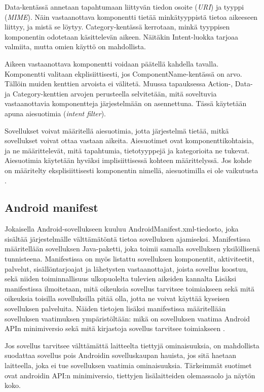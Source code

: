 Data-kentässä annetaan tapahtumaan liittyvän tiedon osoite (\emph{URI}) ja tyyppi (\emph{MIME}). Näin vastaanottava komponentti tietää minkätyyppistä tietoa aikeeseen liittyy, ja mistä se löytyy. Category-kentässä kerrotaan, minkä tyyppisen komponentin odotetaan käsittelevän aikeen. Näitäkin Intent-luokka tarjoaa valmiita, mutta omien käyttö on mahdollista.

Aikeen vastaanottava komponentti voidaan päätellä kahdella tavalla. Komponentti valitaan ekplisiittisesti, jos ComponentName-kentässä on arvo. Tällöin muiden kenttien arvoista ei välitetä. Muussa tapauksessa Action-, Data- ja Category-kenttien arvojen perusteella selvitetään, mitä soveltuvia vastaanottavia komponentteja järjestelmään on asennettuna. Tässä käytetään apuna aiesuotimia (\emph{intent filter}).

Sovellukset voivat määritellä aiesuotimia, jotta järjestelmä tietää, mitkä sovellukset voivat ottaa vastaan aikeita. Aiesuotimet ovat komponenttikohtaisia, ja ne määrittelevät, mitä tapahtumia, tietotyyppejä ja kategorioita ne tukevat. Aiesuotimia käytetään hyväksi implisiittisessä kohteen määrittelyssä. Jos kohde on määritelty eksplisiittisesti komponentin nimellä, aiesuotimilla ei ole vaikutusta \cite{android}.

\subsection{Android manifest}

Jokaisella Android-sovellukseen kuuluu AndroidManifest.xml-tiedosto, joka sisältää järjestelmälle välttämätöntä tietoa sovelluksen ajamiseksi. Manifestissa määritellään sovelluksen Java-paketti, joka toimii samalla sovelluksen yksilöllisenä tunnisteena. Manifestissa on myös listattu sovelluksen komponentit, aktiviteetit, palvelut, sisällöntarjoajat ja lähetysten vastaanottajat, joista sovellus koostuu, sekä niiden toiminnallisuus ulkopuolelta tulevien aikeiden kannalta Lisäksi manifestissa ilmoitetaan, mitä oikeuksia sovellus tarvitsee toimiakseen sekä mitä oikeuksia toisilla sovelluksilla pitää olla, jotta ne voivat käyttää kyseisen sovelluksen palveluita. Näiden tietojen lisäksi manifestissa määritellään sovelluksen vaatimuksen ympäristöltään: mikä on sovelluksen vaatima Android APIn minimiversio sekä mitä kirjastoja sovellus tarvitsee toimiakseen \cite{android}.

Jos sovellus tarvitsee välttämättä laitteelta tiettyjä ominaisuuksia, on mahdollista suodattaa sovellus pois Androidin sovelluskaupan hauista, jos sitä haetaan laitteella, joka ei tue sovelluksen vaatimia ominaisuuksia. Tärkeimmät suotimet ovat androidin API:n minimiversio, tiettyjen lisälaitteiden olemassaolo ja näytön koko.


